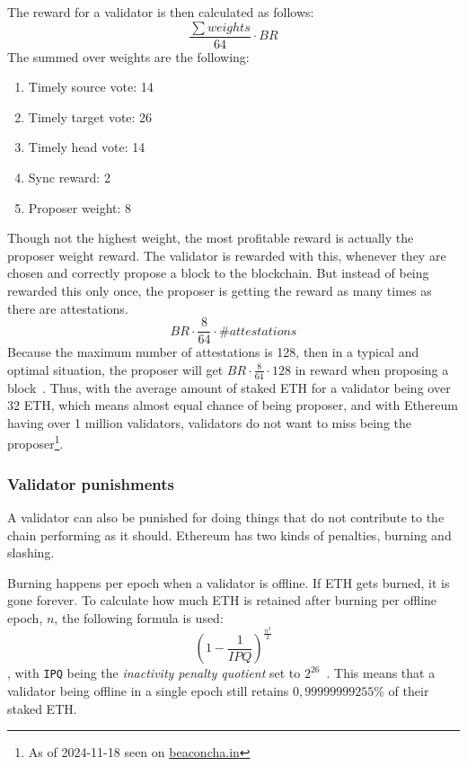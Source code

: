 The reward for a validator is then calculated as follows:
\begin{equation}
    \frac{\sum{weights}}{64}\cdot BR
    \label{eq:valrewards}
\end{equation}
The summed over weights are the following:
\begin{enumerate}
    \item Timely source vote: 14
    \item Timely target vote: 26
    \item Timely head vote: 14
    \item Sync reward: 2
    \item Proposer weight: 8
\end{enumerate}
Though not the highest weight, the most profitable reward is actually the proposer weight reward.
The validator is rewarded with this, whenever they are chosen and correctly propose a block to the blockchain.
But instead of being rewarded this only once, the proposer is getting the reward as many times as there are attestations.
\begin{equation}
    BR\cdot\frac{8}{64}\cdot \#attestations\label
    {eq:propreward}
\end{equation}
Because the maximum number of attestations is 128, then in a typical and optimal situation, the proposer will get $BR\cdot\frac{8}{64}\cdot128$ in reward when proposing a block~\cite{PoSRewAndPen,consensus-spec-phase-0}.
Thus, with the average amount of staked ETH for a validator being over 32 ETH, which means almost equal chance of being proposer, and with Ethereum having over 1 million validators, validators do not want to miss being the proposer\footnote{As of 2024-11-18 seen on \href{https://beaconcha.in/}{beaconcha.in}}.

\subsubsection{Validator punishments}\label{subsubsec:valpunish}
A validator can also be punished for doing things that do not contribute to the chain performing as it should.
Ethereum has two kinds of penalties, burning and slashing.

Burning happens per epoch when a validator is offline.
If ETH gets burned, it is gone forever.
To calculate how much ETH is retained after burning per offline epoch, $n$, the following formula is used:
\begin{equation}
\left(1-\frac{1}{IPQ}\right)^\frac{n^2}{2}
\label{eq:burn}
\end{equation}, with \texttt{IPQ} being the \textit{inactivity penalty quotient} set to $2^{26}$~\cite{consensus-spec-phase-0}.
This means that a validator being offline in a single epoch still retains $0,99999999255\%$ of their staked ETH\@.

